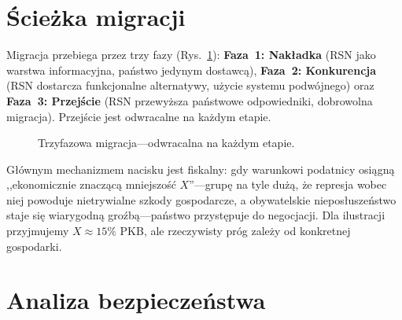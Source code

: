 \documentclass[11pt,a4paper,twocolumn]{article}
\begin{document}
\section{Ścieżka migracji}

Migracja przebiega przez trzy fazy (Rys.~\ref{fig:migration}): \textbf{Faza~1: Nakładka} (RSN jako warstwa informacyjna, państwo jedynym dostawcą), \textbf{Faza~2: Konkurencja} (RSN dostarcza funkcjonalne alternatywy, użycie systemu podwójnego) oraz \textbf{Faza~3: Przejście} (RSN przewyższa państwowe odpowiedniki, dobrowolna migracja). Przejście jest odwracalne na każdym etapie.

\begin{figure}[ht]
\centering
{}
\caption{Trzyfazowa migracja---odwracalna na każdym etapie.}
\label{fig:migration}
\end{figure}

Głównym mechanizmem nacisku jest fiskalny: gdy warunkowi podatnicy osiągną ,,ekonomicznie znaczącą mniejszość $X$''---grupę na tyle dużą, że represja wobec niej powoduje nietrywialne szkody gospodarcze, a obywatelskie nieposłuszeństwo staje się wiarygodną groźbą---państwo przystępuje do negocjacji. Dla ilustracji przyjmujemy $X \approx 15\%$ PKB, ale rzeczywisty próg zależy od konkretnej gospodarki.

\section{Analiza bezpieczeństwa}
\end{document}
